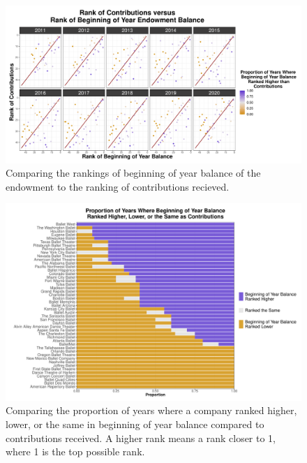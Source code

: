 \documentclass[Dance Data
Project,article,submit,moreauthors,pdftex]{mdpi}
\begin{document}
\begin{figure}[H]
\includegraphics[width=0.75\linewidth,]{../images/compare-rankings-balance-contributions} \caption{\label{fig:balancecont} Comparing the rankings of beginning of year balance of the endowment to the ranking of contributions recieved.}\label{fig:compare-rankings-balance-contributions}
\end{figure}

\begin{figure}[H]
\includegraphics[width=0.6\linewidth,]{../images/compare-rankings-balance-contributions-barplot} \caption{\label{fig:balancecontbar} Comparing the proportion of years where a company ranked higher, lower, or the same in beginning of year balance compared to contributions received. A higher rank means a rank closer to 1, where 1 is the top possible rank.}\label{fig:compare-rankings-balance-contributions-barplot}
\end{figure}

%
\end{document}
